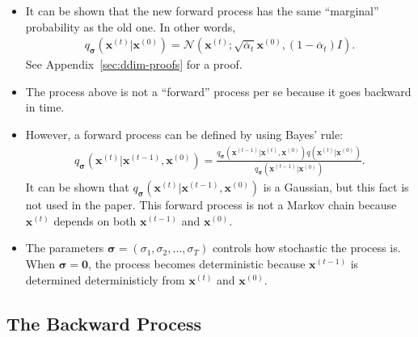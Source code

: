 \documentclass[10pt]{article}
\newcommand{\ve}[1]{\mathbf{#1}}
\newcommand{\ves}[1]{\boldsymbol{#1}}
\newcommand{\mcal}[1]{\mathcal{#1}}
\begin{document}
\begin{itemize}
  \item It can be shown that the new forward process has the same ``marginal'' probability as the old one. In other words,
  \begin{align*}
    q_{\ves{\sigma}}(\ve{x}^{(t)}|\ve{x}^{(0)}) = \mcal{N}(\ve{x}^{(t)}; \sqrt{\overline{\alpha}_t} \ve{x}^{(0)}, (1-\overline{\alpha}_t) I).
  \end{align*}
  See Appendix~\ref{sec:ddim-proofs} for a proof.

  \item The process above is not a ``forward'' process per se because it goes backward in time.
  
  \item However, a forward process can be defined by using Bayes' rule:
  \begin{align*}
    q_{\ves{\sigma}}(\ve{x}^{(t)}|\ve{x}^{(t-1)}, \ve{x}^{(0)}) = \frac{q_{\ves{\sigma}}(\ve{x}^{(t-1)}|\ve{x}^{(t)},\ve{x}^{(0)})q(\ve{x}^{(t)}|\ve{x}^{(0)})}{q_{\ves{\sigma}}(\ve{x}^{(t-1)}|\ve{x}^{(0)})}.
  \end{align*}
  It can be shown that $q_{\ves{\sigma}}(\ve{x}^{(t)}|\ve{x}^{(t-1)}, \ve{x}^{(0)})$ is a Gaussian, but this fact is not used in the paper. This forward process is not a Markov chain because $\ve{x}^{(t)}$ depends on both $\ve{x}^{(t-1)}$ and $\ve{x}^{(0)}$.

  \item The parameters $\ves{\sigma} = (\sigma_1, \sigma_2, \dotsc, \sigma_T)$ controls how stochastic the process is. When $\ves{\sigma} = \ve{0}$, the process becomes deterministic because $\ve{x}^{(t-1)}$ is determined deterministicly from $\ve{x}^{(t)}$ and $\ve{x}^{(0)}$.
\end{itemize}

\subsection{The Backward Process}
\end{document}
